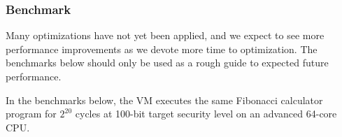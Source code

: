 \subsubsection{Benchmark}\label{section: starky-benchmark}

Many optimizations have not yet been applied, and we expect to see more performance improvements as we devote more time to optimization. The benchmarks below should only be used as a rough guide to expected future performance.

In the benchmarks below, the VM executes the same Fibonacci calculator program for $2^{20}$ cycles at 100-bit target security level on an advanced 64-core CPU.

\begin{table}[!ht]
    \centering {}
\end{table}